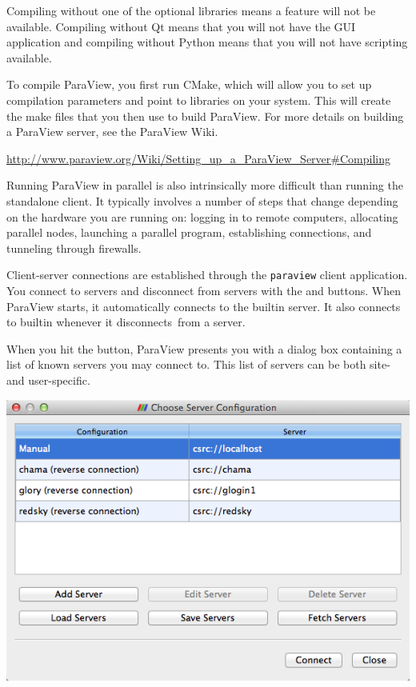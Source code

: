 Compiling without one of the optional libraries means a feature will not be
available.  Compiling without Qt means that you will not have the GUI
application and compiling without Python means that you will not have
scripting available.

To compile ParaView, you first run CMake, which will allow you to set up
compilation parameters and point to libraries on your system.  This will
create the make files that you then use to build ParaView.  For more
details on building a ParaView server, see the ParaView Wiki.

{
  \footnotesize
  \href{http://www.paraview.org/Wiki/Setting_up_a_ParaView_Server#Compiling}{http://www.paraview.org/Wiki/Setting\_up\_a\_ParaView\_Server\#Compiling}
}

Running ParaView in parallel is also intrinsically more difficult than
running the standalone client.  It typically involves a number of steps
that change depending on the hardware you are running on: logging in to
remote computers, allocating parallel nodes, launching a parallel program,
establishing connections, and tunneling through firewalls.

Client-server connections are established through the \texttt{paraview}
client application.  You connect to servers and disconnect from servers
with the \connect and \disconnect buttons.  When ParaView starts, it
automatically connects to the builtin server.  It also connects to
builtin whenever it disconnects~\disconnect from a server.

When you hit the \connect button, ParaView presents you with a dialog box
containing a list of known servers you may connect to.  This list of
servers can be both site- and user-specific.

\begin{inlinefig}
  \includegraphics[width=.66\scw]{images/ChooseServer}
\end{inlinefig}


